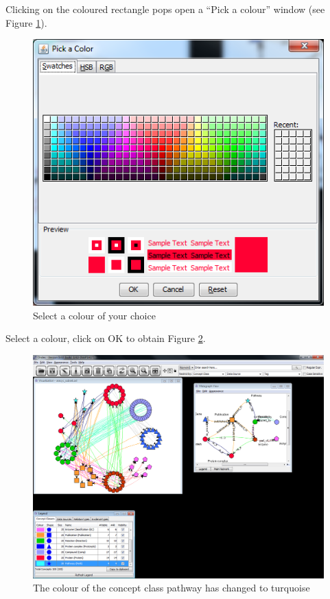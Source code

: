 Clicking on the coloured rectangle pops open a ``Pick a colour'' window (see Figure \ref{fig:aracyc_pick}).
\begin{figure}[H]
\centering
\includegraphics[scale=0.5]{images/Jun12/aracyc_pick_a_colour.png} 
\caption{Select a colour of your choice}
\label{fig:aracyc_pick}
\end{figure}

Select a colour, click on OK to obtain Figure \ref{fig:aracyc_changed_colour}.
\begin{figure}[H]
\centering
\includegraphics[scale=0.3]{images/Jun12/aracyc_colour_changed_from_legend.png} 
\caption{The colour of the concept class pathway has changed to turquoise}
\label{fig:aracyc_changed_colour}
\end{figure}

